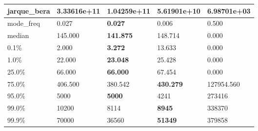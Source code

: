\begin{table}[H]
\begin{tabular}{|l|m{10em}|m{10em}|m{10em}|m{10em}|}
\hline jarque\_bera & 3.33616e+11 & \bfseries 1.04259e+11 & 5.61901e+10 & \cellcolor[rgb]{0.9, 0.54, 0.52} 6.98701e+03 \\
\hline mode\_freq & 0.027 & \bfseries 0.027 & 0.006 & \cellcolor[rgb]{0.9, 0.54, 0.52} 0.500 \\
\hline median & 145.000 & \bfseries 141.875 & 148.714 & \cellcolor[rgb]{0.9, 0.54, 0.52} 0.000 \\
\hline 0.1\% & 2.000 & \bfseries 3.272 & \cellcolor[rgb]{0.9, 0.54, 0.52} 13.633 & 0.000 \\
\hline 1.0\% & 22.000 & \bfseries 23.048 & 25.428 & \cellcolor[rgb]{0.9, 0.54, 0.52} 0.000 \\
\hline 25.0\% & 66.000 & \bfseries 66.000 & 67.454 & \cellcolor[rgb]{0.9, 0.54, 0.52} 0.000 \\
\hline 75.0\% & 406.500 & 380.542 & \bfseries 430.279 & \cellcolor[rgb]{0.9, 0.54, 0.52} 127954.560 \\
\hline 95.0\% & 5000 & \bfseries 5000 & 4241 & \cellcolor[rgb]{0.9, 0.54, 0.52} 273416 \\
\hline 99.0\% & 10200 & 8114 & \bfseries 8945 & \cellcolor[rgb]{0.9, 0.54, 0.52} 338370 \\
\hline 99.9\% & 70000 & 36560 & \bfseries 51349 & \cellcolor[rgb]{0.9, 0.54, 0.52} 379858 \\
\hline
\end{tabular}
\end{table}
